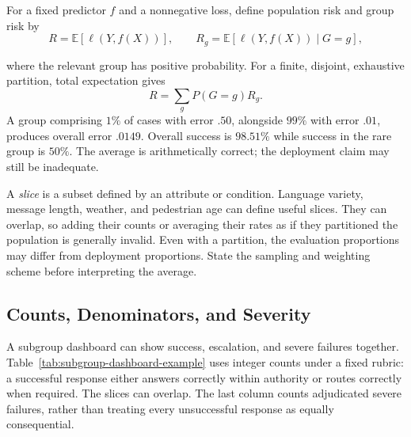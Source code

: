 \par\noindent\begin{minipage}{\linewidth}
For a fixed predictor $f$ and a nonnegative loss, define population risk and group risk by
\[
R=\mathbb E[\ell(Y,f(X))],\qquad
R_g=\mathbb E[\ell(Y,f(X))\mid G=g],
\]
\end{minipage}\par\addvspace{\belowdisplayskip}
where the relevant group has positive probability. For a finite, disjoint, exhaustive partition, total expectation gives
\[
R=\sum_g P(G=g)R_g.
\]
A group comprising $1\%$ of cases with error $.50$, alongside $99\%$ with error $.01$, produces overall error $.0149$. Overall success is $98.51\%$ while success in the rare group is $50\%$. The average is arithmetically correct; the deployment claim may still be inadequate.

A \emph{slice} is a subset defined by an attribute or condition. Language variety, message length, weather, and pedestrian age can define useful slices. They can overlap, so adding their counts or averaging their rates as if they partitioned the population is generally invalid. Even with a partition, the evaluation proportions may differ from deployment proportions. State the sampling and weighting scheme before interpreting the average.

\par\addvspace{\intextsep}\noindent\begin{minipage}{\linewidth}
\centering

\label{fig:reliability-matrix}
\end{minipage}\par\addvspace{\intextsep}

\subsection{Counts, Denominators, and Severity}

A subgroup dashboard can show success, escalation, and severe failures together. Table~\ref{tab:subgroup-dashboard-example} uses integer counts under a fixed rubric: a successful response either answers correctly within authority or routes correctly when required. The slices can overlap. The last column counts adjudicated severe failures, rather than treating every unsuccessful response as equally consequential.

